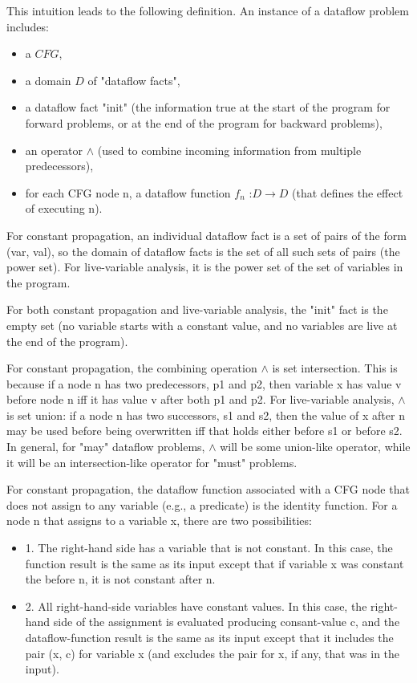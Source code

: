 This intuition leads to the following definition. An instance of a dataflow problem includes:
\begin{itemize}
    \item a \(CFG\),
    \item a domain \(D\) of "dataflow facts",
    \item a dataflow fact "init" (the information true at the start of the program for forward problems, 
    or at the end of the program for backward problems),
    \item an operator \(\wedge\) (used to combine incoming information from multiple predecessors),
    \item for each CFG node n, a dataflow function \(f_n\) :\( D \rightarrow D\) (that defines the effect of 
    executing n).
\end{itemize} 

For constant propagation, an individual dataflow fact is a set of pairs of the form (var, val),
 so the domain of dataflow facts is the set of all such sets of pairs (the power set). 
 For live-variable analysis, it is the power set of the set of variables in the program.

For both constant propagation and live-variable analysis, the "init" fact is the empty set 
(no variable starts with a constant value, and no variables are live at the end of the program).



For constant propagation, the combining operation \(\wedge\) is set intersection. 
This is because if a node n has two predecessors, p1 and p2, then variable x has value v before 
node n iff it has value v after both p1 and p2. For live-variable analysis, 
\(\wedge\) is set union: if a node n has two successors, s1 and s2, then the value of x after n may be 
used before being overwritten iff that holds either before s1 or before s2. In general, 
for "may" dataflow problems, \(\wedge\) will be some union-like operator, while it will be an intersection-like 
operator for "must" problems.

For constant propagation, the dataflow function associated with a CFG node that does not assign 
to any variable (e.g., a predicate) is the identity function. For a node n that assigns to 
a variable x, there are two possibilities:

\begin{itemize}
\item 1. The right-hand side has a variable that is not constant. In this case, the function 
result is the same as its input except that if variable x was constant the before n, 
it is not constant after n.
\item 2. All right-hand-side variables have constant values. In this case, the right-hand side of 
the assignment is evaluated producing consant-value c, and the dataflow-function result is the 
same as its input except that it includes the pair (x, c) for variable x (and excludes the pair 
for x, if any, that was in the input).
\end{itemize}


